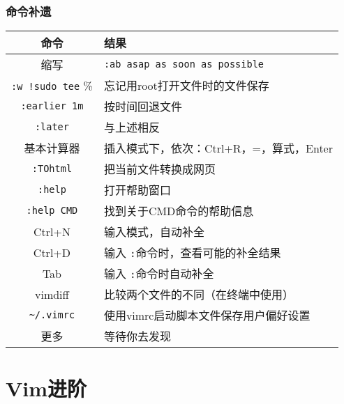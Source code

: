 \begin{frame}[fragile]
  \frametitle{命令补遗}
  \begin{table}
    \centering
    \begin{tabularx}{\textwidth}{cX}
      \hline
      \rowcolor{blue!50}命令 & 结果\\
      \hline
      缩写 & \verb|:ab asap as soon as possible|\\
      \hline
      \verb|:w !sudo tee| \% & 忘记用root打开文件时的文件保存\\
      \hline
      \verb|:earlier 1m| & 按时间回退文件\\ 
      \verb|:later| & 与上述相反\\ 
      \hline
      基本计算器 & 插入模式下，依次：Ctrl+R，=，算式，Enter\\
      \hline
      \verb|:TOhtml| & 把当前文件转换成网页\\
      \hline
      \verb|:help| & 打开帮助窗口\\
      \verb|:help CMD| & 找到关于CMD命令的帮助信息\\
      \hline
      Ctrl+N & 输入模式，自动补全\\
      \hline
      Ctrl+D & 输入 \verb|:|命令时，查看可能的补全结果\\
      Tab & 输入 \verb|:|命令时自动补全\\
      \hline
      vimdiff & 比较两个文件的不同（在终端中使用）\\
      \verb|~/.vimrc| & 使用vimrc启动脚本文件保存用户偏好设置\\
      \hline
      更多 & 等待你去发现\\
      \hline
    \end{tabularx}
  \end{table}
\end{frame}

\section{Vim进阶}
